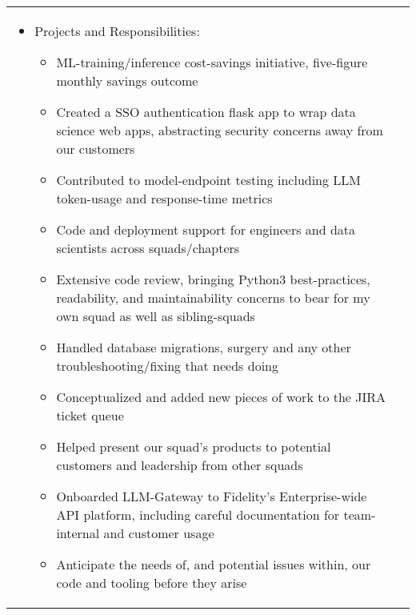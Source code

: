\documentclass[a4paper,12pt]{article}
\begin{document}
\begin{tabularx}{\linewidth}{ @{}l r@{} }
{\begin{minipage}[t]{\linewidth}
\begin{itemize}[nosep,after=\strut, leftmargin=1em, itemsep=3pt]
    \item Projects and Responsibilities:
    	\begin{itemize}
			\item ML-training/inference cost-savings initiative, five-figure monthly savings outcome
			\item Created a SSO authentication flask app to wrap data science web apps, abstracting security concerns away from our customers
    		\item Contributed to model-endpoint testing including LLM token-usage and response-time metrics
			\item Code and deployment support for engineers and data scientists across squads/chapters
			\item Extensive code review, bringing Python3 best-practices, readability, and maintainability concerns to bear for my own squad as well as sibling-squads
			\item Handled database migrations, surgery and any other troubleshooting/fixing that needs doing
			\item Conceptualized and added new pieces of work to the JIRA ticket queue
			\item Helped present our squad's products to potential customers and leadership from other squads
			\item Onboarded LLM-Gateway to Fidelity's Enterprise-wide API platform, including careful documentation for team-internal and customer usage
			\item Anticipate the needs of, and potential issues within, our code and tooling before they arise
		\end{itemize}
    \end{itemize}
    \end{minipage}
}
\end{tabularx}
\end{document}
